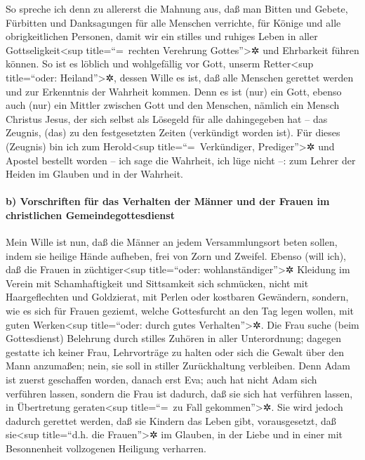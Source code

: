  So spreche ich denn zu allererst die Mahnung aus, daß man
Bitten und Gebete, Fürbitten und Danksagungen für alle Menschen
verrichte,  für Könige und alle obrigkeitlichen Personen,
damit wir ein stilles und ruhiges Leben in aller
Gottseligkeit\textless sup title=``=~rechten Verehrung
Gottes''\textgreater✲ und Ehrbarkeit führen können.  So
ist es löblich und wohlgefällig vor Gott, unserm Retter\textless sup
title=``oder: Heiland''\textgreater✲,  dessen Wille es
ist, daß alle Menschen gerettet werden und zur Erkenntnis der Wahrheit
kommen.  Denn es ist (nur) ein Gott, ebenso auch (nur) ein
Mittler zwischen Gott und den Menschen, nämlich ein Mensch Christus
Jesus,  der sich selbst als Lösegeld für alle dahingegeben
hat -- das Zeugnis, (das) zu den festgesetzten Zeiten (verkündigt worden
ist).  Für dieses (Zeugnis) bin ich zum
Herold\textless sup title=``=~Verkündiger, Prediger''\textgreater✲ und
Apostel bestellt worden -- ich sage die Wahrheit, ich lüge nicht --: zum
Lehrer der Heiden im Glauben und in der Wahrheit.

\hypertarget{b-vorschriften-fuxfcr-das-verhalten-der-muxe4nner-und-der-frauen-im-christlichen-gemeindegottesdienst}{%
\paragraph{b) Vorschriften für das Verhalten der Männer und der Frauen
im christlichen
Gemeindegottesdienst}\label{b-vorschriften-fuxfcr-das-verhalten-der-muxe4nner-und-der-frauen-im-christlichen-gemeindegottesdienst}}

 Mein Wille ist nun, daß die Männer an jedem
Versammlungsort beten sollen, indem sie heilige Hände aufheben, frei von
Zorn und Zweifel.  Ebenso (will ich), daß die Frauen in
züchtiger\textless sup title=``oder: wohlanständiger''\textgreater✲
Kleidung im Verein mit Schamhaftigkeit und Sittsamkeit sich schmücken,
nicht mit Haargeflechten und Goldzierat, mit Perlen oder kostbaren
Gewändern,  sondern, wie es sich für Frauen geziemt,
welche Gottesfurcht an den Tag legen wollen, mit guten
Werken\textless sup title=``oder: durch gutes Verhalten''\textgreater✲.
 Die Frau suche (beim Gottesdienst) Belehrung durch
stilles Zuhören in aller Unterordnung;  dagegen gestatte
ich keiner Frau, Lehrvorträge zu halten oder sich die Gewalt über den
Mann anzumaßen; nein, sie soll in stiller Zurückhaltung verbleiben.
 Denn Adam ist zuerst geschaffen worden, danach erst Eva;
 auch hat nicht Adam sich verführen lassen, sondern die
Frau ist dadurch, daß sie sich hat verführen lassen, in Übertretung
geraten\textless sup title=``=~zu Fall gekommen''\textgreater✲.
 Sie wird jedoch dadurch gerettet werden, daß sie Kindern
das Leben gibt, vorausgesetzt, daß sie\textless sup title=``d.h. die
Frauen''\textgreater✲ im Glauben, in der Liebe und in einer mit
Besonnenheit vollzogenen Heiligung verharren.

